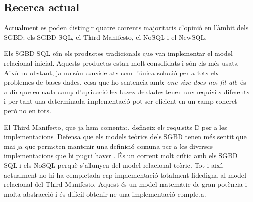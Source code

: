 









\subsection{Recerca actual}

Actualment es poden distingir quatre corrents majoritaris d'opinió en
l'àmbit dels SGBD: els SGBD SQL, el Third Manifesto, el NoSQL i el
NewSQL.

Els SGBD SQL són els productes tradicionals que van implementar el
model relacional inicial. Aquests productes estan molt consolidats i
són els més usats. Això no obstant, ja no són considerats com l'única
solució per a tots els problemes de bases dades, cosa que
\textcite{stonebraker07,stonebraker09} ho sentencia amb: \emph{one
  size does not fit all}; és a dir que en cada camp d'aplicació les
bases de dades tenen uns requisits diferents i per tant una
determinada implementació pot ser eficient en un camp concret però no
en tots.  



\todo{}


El Third Manifesto, que ja hem comentat, defineix els requisits D per
a les implementacions. Defensa que els models teòrics dels SGBD tenen
més sentit que mai ja que permeten mantenir una definició comuna per a
les diverses implementacions que hi pugui
haver \parencite{datedarwen13:notosql_notonosql}.  És un corrent molt
crític amb els SGBD SQL i els NoSQL perquè s'allunyen del model
relacional teòric.  Tot i així, actualment no hi ha completada cap
implementació totalment fidedigna al model relacional del Third
Manifesto. Aquest és un model matemàtic de gran potència i molta
abstracció i és difícil obtenir-ne una implementació completa.









